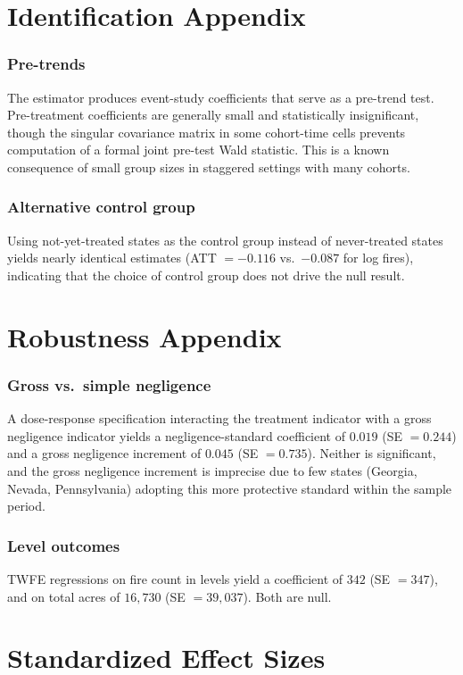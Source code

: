 \documentclass[12pt]{article}
\begin{document}
\section{Identification Appendix}

\subsubsection*{Pre-trends} The \citet{CallawayS2021} estimator produces event-study coefficients that serve as a pre-trend test. Pre-treatment coefficients are generally small and statistically insignificant, though the singular covariance matrix in some cohort-time cells prevents computation of a formal joint pre-test Wald statistic. This is a known consequence of small group sizes in staggered settings with many cohorts.

\subsubsection*{Alternative control group} Using not-yet-treated states as the control group instead of never-treated states yields nearly identical estimates (ATT $= -0.116$ vs.\ $-0.087$ for log fires), indicating that the choice of control group does not drive the null result.

\section{Robustness Appendix}

\subsubsection*{Gross vs.\ simple negligence} A dose-response specification interacting the treatment indicator with a gross negligence indicator yields a negligence-standard coefficient of $0.019$ (SE $= 0.244$) and a gross negligence increment of $0.045$ (SE $= 0.735$). Neither is significant, and the gross negligence increment is imprecise due to few states (Georgia, Nevada, Pennsylvania) adopting this more protective standard within the sample period.

\subsubsection*{Level outcomes} TWFE regressions on fire count in levels yield a coefficient of $342$ (SE $= 347$), and on total acres of $16{,}730$ (SE $= 39{,}037$). Both are null.

\section{Standardized Effect Sizes}
\label{sec:sde}


\end{document}
